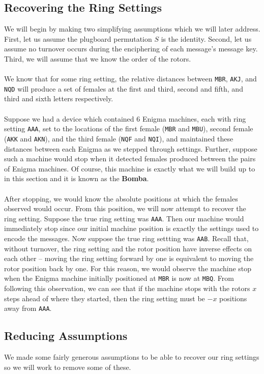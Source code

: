 \subsection{Recovering the Ring Settings}
We will begin by making two simplifying assumptions which we will later address. First, let us assume the plugboard permutation $S$ is the identity. Second, let us assume no turnover occurs during the enciphering of each message's message key. Third, we will assume that we know the order of the rotors.
\\\\We know that for some ring setting, the relative distances between \texttt{MBR}, \texttt{AKJ}, and \texttt{NQD} will produce a set of females at the first and third, second and fifth, and third and sixth letters respectively.
\\\\Suppose we had a device which contained 6 Enigma machines, each with ring setting \texttt{AAA}, set to the locations of the first female (\texttt{MBR} and \texttt{MBU}), second female (\texttt{AKK} and \texttt{AKN}), and the third female (\texttt{NQF} and \texttt{NQI}), and maintained these distances between each Enigma as we stepped through settings. Further, suppose such a machine would stop when it detected females produced between the pairs of Enigma machines. Of course, this machine is exactly what we will build up to in this section and it is known as the {\bf{Bomba}}.
\\\\After stopping, we would know the absolute positions at which the females observed would occur. From this position, we will now attempt to recover the ring setting. Suppose the true ring setting was \texttt{AAA}. Then our machine would immediately stop since our initial machine position is exactly the settings used to encode the messages. Now suppose the true ring settting was \texttt{AAB}. Recall that, without turnover, the ring setting and the rotor position have inverse effects on each other -- moving the ring setting forward by one is equivalent to moving the rotor position back by one. For this reason, we would observe the machine stop when the Enigma machine initially positioned at \texttt{MBR} is now at \texttt{MBQ}. From following this observation, we can see that if the machine stops with the rotors $x$ steps ahead of where they started, then the ring setting must be $-x$ positions away from \texttt{AAA}.

\subsection{Reducing Assumptions}
We made some fairly generous assumptions to be able to recover our ring settings so we will work to remove some of these.

